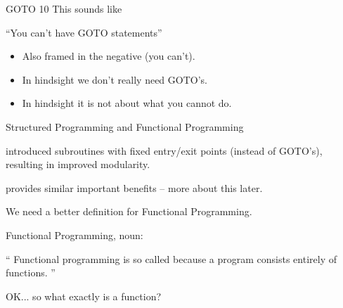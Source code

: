 \documentclass{beamer}
\begin{document}
\begin{frame}{GOTO 10}
    This sounds like
  \begin{exampleblock}{}
    {\Large ``You can't have GOTO statements''}
  \end{exampleblock}
  \vskip5mm
  \hspace*{}

  \begin{itemize}[<+->]
  \item Also framed in the negative (you can't).
  \item In hindsight we don't really need GOTO's.
  \item In hindsight it is not about what you cannot do.
  \end{itemize}
\end{frame}

\begin{frame}{Structured Programming and Functional Programming}
  \begin{description}[<+->]
  \item[Structured Programming] introduced subroutines with fixed
    entry/exit points (instead of GOTO's), resulting in improved
    modularity.
  \item[Functional Programming] provides similar important benefits --
    more about this later.
  \end{description}
\end{frame}

\begin{frame}{}

  {\Large We need a better definition for Functional Programming.}

\end{frame}

\begin{frame}{Functional Programming, noun:}

\begin{exampleblock}{}
  {\Large ``
  Functional programming is so called because a program consists entirely of functions.
  ''}
  \vskip5mm
  \hspace*{}
\end{exampleblock}
\end{frame}

\begin{frame}{}

  {\Large OK... so what exactly is a function?}

\end{frame}
\end{document}
